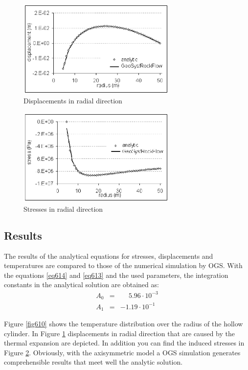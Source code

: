 \begin{figure}[htbp]
\centering
\includegraphics[width=0.7\textwidth]{PART_III/TM/figures/fig611}
\caption{Displacements in radial direction}
\label{fig611}
\end{figure}

\begin{figure}[htbp]
\centering
\includegraphics[width=0.7\textwidth]{PART_III/TM/figures/fig612}
\caption{Stresses in radial direction}
\label{fig612}
\end{figure}

\subsection{Results}
The results of the analytical equations for stresses, displacements and temperatures are compared to those of the numerical simulation by OGS. 
With the equations \eqref{eq614} and \eqref{eq613} and the used parameters, the integration constants in the analytical solution are obtained as: 
\begin{eqnarray*}
A_0 & = & \phantom{-}5.96\cdot10^{-3} \\[1.0ex]
A_1 & = & -1.19\cdot10^{-1}
\end{eqnarray*}

Figure \ref{fig610} shows the temperature distribution over the radius of the hollow cylinder. In Figure \ref{fig611} displacements in radial direction that are caused by the thermal expansion are depicted. In addition you can find the induced stresses in Figure \ref{fig612}. Obviously, with the axisymmetric model a OGS simulation generates comprehensible results that meet well the analytic solution.